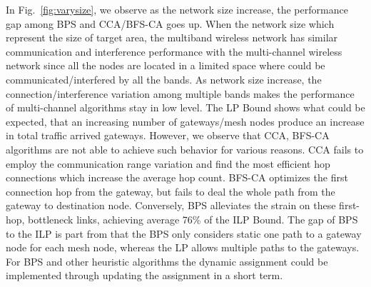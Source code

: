 In Fig.~\ref{fig:varysize}, we observe as the network size increase, the performance
gap among BPS and CCA/BFS-CA goes up. When the network size which represent the size 
of target area, the multiband wireless network has similar communication and interference 
performance with the multi-channel wireless network since all the nodes are located in a 
limited space where could be communicated/interfered by all the bands. As network size 
increase, the connection/interference variation among multiple bands makes the performance 
of multi-channel algorithms stay in low level. The LP Bound shows what could be expected, 
that an increasing number of gateways/mesh nodes produce an increase in total traffic 
arrived gateways. However, we observe that CCA, BFS-CA algorithms are not able to achieve 
such behavior for various reasons. CCA fails to employ the communication range variation 
and find the most efficient hop connections which increase the average hop count. BFS-CA 
optimizes the first connection hop from the gateway, but fails to deal the whole path 
from the gateway to destination node. Conversely, BPS alleviates the strain on these 
first-hop, bottleneck links, achieving average 76\% of the ILP Bound. The gap of BPS 
to the ILP is part from that the BPS only considers static one path to a gateway node for 
each mesh node, whereas the LP allows multiple paths to the gateways. For BPS and other 
heuristic algorithms the dynamic assignment could be implemented through updating the 
assignment in a short term.

